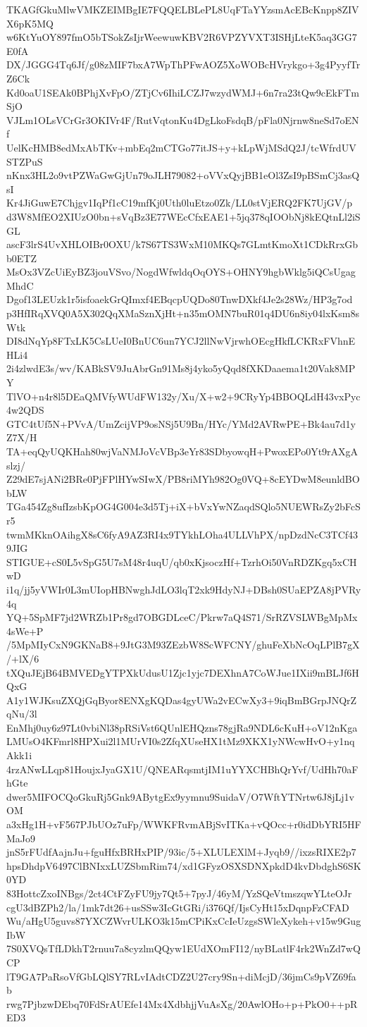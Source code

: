 TKAGfGkuMlwVMKZEIMBgIE7FQQELBLePL8UqFTaYYzsmAcEBcKnpp8ZIVX6pK5MQ
w6KtYuOY897fmO5bTSokZsIjrWeewuwKBV2R6VPZYVXT3ISHjLteK5aq3GG7E0fA
DX/JGGG4Tq6Jf/g08zMIF7bxA7WpThPFwAOZ5XoWOBcHVrykgo+3g4PyyfTrZ6Ck
Kd0oaU1SEAk0BPhjXvFpO/ZTjCv6IhiLCZJ7wzydWMJ+6n7ra23tQw9cEkFTmSjO
VJLm1OLsVCrGr3OKIVr4F/RutVqtonKu4DgLkoFsdqB/pFla0Njrnw8neSd7oENf
UelKcHMB8edMxAbTKv+mbEq2mCTGo77itJS+y+kLpWjMSdQ2J/tcWfrdUVSTZPuS
nKnx3HL2o9vtPZWaGwGjUn79oJLH79082+oVVxQyjBB1eOl3ZsI9pBSmCj3asQsI
Kr4JiGuwE7Chjgv1IqPf1cC19mfKj0Uth0luEtzo0Zk/LL0stVjERQ2FK7UjGV/p
d3W8MfEO2XIUzO0bn+sVqBz3E77WEcCfxEAE1+5jq378qIOObNj8kEQtnLl2iSGL
ascF3lrS4UvXHLOIBr0OXU/k7S67TS3WxM10MKQs7GLmtKmoXt1CDkRrxGbb0ETZ
MsOx3VZcUiEyBZ3jouVSvo/NogdWfwldqOqOYS+OHNY9hgbWklg5iQCsUgagMhdC
Dgof13LEUzk1r5isfoaekGrQImxf4EBqcpUQDo80TnwDXkf4Je2s28Wz/HP3g7od
p3HfIRqXVQ0A5X302QqXMaSznXjHt+n35mOMN7buR01q4DU6n8iy04lxKsm8sWtk
DI8dNqYp8FTxLK5CsLUeI0BnUC6un7YCJ2llNwVjrwhOEcgHkfLCKRxFVhnEHLi4
2i4zlwdE3s/wv/KABkSV9JuAbrGn91Ms8j4yko5yQqd8fXKDaaema1t20Vak8MPY
TlVO+n4r8l5DEaQMVfyWUdFW132y/Xu/X+w2+9CRyYp4BBOQLdH43vxPyc4w2QDS
GTC4tUf5N+PVvA/UmZcijVP9osNSj5U9Bn/HYc/YMd2AVRwPE+Bk4au7d1yZ7X/H
TA+eqQyUQKHah80wjVaNMJoVcVBp3eYr83SDbyowqH+PwoxEPo0Yt9rAXgAslzj/
Z29dE7sjANi2BRe0PjFPlHYwSIwX/PB8riMYh982Og0VQ+8cEYDwM8eunldBObLW
TGa454Zg8ufIzsbKpOG4G004e3d5Tj+iX+bVxYwNZaqdSQlo5NUEWRsZy2bFcSr5
twmMKknOAihgX8sC6fyA9AZ3RI4x9TYkhLOha4ULLVhPX/npDzdNcC3TCf439JIG
STIGUE+cS0L5vSpG5U7sM48r4uqU/qb0xKjsoczHf+TzrhOi50VnRDZKgq5xCHwD
i1q/jj5yVWIr0L3mUIopHBNwghJdLO3lqT2xk9HdyNJ+DBsh0SUaEPZA8jPVRy4q
YQ+5SpMF7jd2WRZb1Pr8gd7OBGDLceC/Pkrw7aQ4S71/SrRZVSLWBgMpMx4sWe+P
/5MpMIyCxN9GKNaB8+9JtG3M93ZEzbW8ScWFCNY/ghuFeXbNcOqLPlB7gX/+lX/6
tXQuJEjB64BMVEDgYTPXkUdusU1Zjc1yjc7DEXhnA7CoWJue1IXii9mBLJf6HQxG
A1y1WJKsuZXQjGqByor8ENXgKQDas4gyUWa2vECwXy3+9iqBmBGrpJNQrZqNu/3l
EnMhj0uy6z97Lt0vbiNl38pRSiVst6QUnlEHQzns78gjRa9NDL6cKuH+oV12nKga
LMUsO4KFmrl8HPXui2l1MUrVI0s2ZfqXUseHX1tMz9XKX1yNWcwHvO+y1nqAkk1i
4rzANwLLqp81HoujxJyaGX1U/QNEARqsmtjIM1uYYXCHBhQrYvf/UdHh70aFhGte
dwer5MIFOCQoGkuRj5Gnk9ABytgEx9yymnu9SuidaV/O7WftYTNrtw6J8jLj1vOM
a3xHg1H+vF567PJbUOz7uFp/WWKFRvmABjSvITKa+vQOcc+r0idDbYRI5HFMaJo9
jnS5rFUdfAajnJu+fguHfxBRHxPIP/93ic/5+XLULEXlM+Jyqb9//ixzsRIXE2p7
hpsDhdpV6497ClBNIxxLUZSbmRim74/xd1GFyzOSXSDNXpkdD4kvDbdghS6SK0YD
83HottcZxoINBgs/2ct4CtFZyFU9jy7Qt5+7pyJ/46yM/YzSQeVtmszqwYLteOJr
cgU3dBZPh2/la/1mk7dt26+usSSw3IcGtGRi/i376Qf/IjsCyHt15xDqnpFzCFAD
Wu/aHgU5guvs87YXCZWvrULKO3k15mCPiKxCcIeUzgsSWleXykeh+v15w9GugIbW
7S0XVQsTfLDkhT2rnuu7a8cyzlmQQyw1EUdXOmFI12/nyBLatlF4rk2WnZd7wQCP
lT9GA7PaRsoVfGbLQlSY7RLvIAdtCDZ2U27cry9Sn+diMcjD/36jmCs9pVZ69fab
rwg7PjbzwDEbq70FdSrAUEfe14Mx4XdbhjjVuAsXg/20AwlOHo+p+PkO0++pRED3
